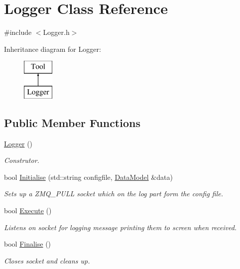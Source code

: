 \hypertarget{classLogger}{\section{Logger Class Reference}
\label{classLogger}
}


{\ttfamily \#include $<$Logger.\-h$>$}

Inheritance diagram for Logger\-:\begin{figure}[H]
\begin{center}
\leavevmode
\includegraphics[height=2.000000cm]{classLogger}
\end{center}
\end{figure}
\subsection*{Public Member Functions}
\begin{DoxyCompactItemize}
\item 
\hypertarget{classLogger_abc41bfb031d896170c7675fa96a6b30c}{\hyperlink{classLogger_abc41bfb031d896170c7675fa96a6b30c}{Logger} ()}\label{classLogger_abc41bfb031d896170c7675fa96a6b30c}

\begin{DoxyCompactList}\small\item\em Construtor. \end{DoxyCompactList}\item 
\hypertarget{classLogger_a1b598f35f454e24f9e9abc9f18c3e98f}{bool \hyperlink{classLogger_a1b598f35f454e24f9e9abc9f18c3e98f}{Initialise} (std\-::string configfile, \hyperlink{classDataModel}{Data\-Model} \&data)}\label{classLogger_a1b598f35f454e24f9e9abc9f18c3e98f}

\begin{DoxyCompactList}\small\item\em Sets up a Z\-M\-Q\-\_\-\-P\-U\-L\-L socket which on the log part form the config file. \end{DoxyCompactList}\item 
\hypertarget{classLogger_a140ebede2975159a5abe7c59e56ec0ec}{bool \hyperlink{classLogger_a140ebede2975159a5abe7c59e56ec0ec}{Execute} ()}\label{classLogger_a140ebede2975159a5abe7c59e56ec0ec}

\begin{DoxyCompactList}\small\item\em Listens on socket for logging message printing them to screen when received. \end{DoxyCompactList}\item 
\hypertarget{classLogger_a2c70367a86d5999db21324ccb58f44ed}{bool \hyperlink{classLogger_a2c70367a86d5999db21324ccb58f44ed}{Finalise} ()}\label{classLogger_a2c70367a86d5999db21324ccb58f44ed}

\begin{DoxyCompactList}\small\item\em Closes socket and cleans up. \end{DoxyCompactList}\end{DoxyCompactItemize}
